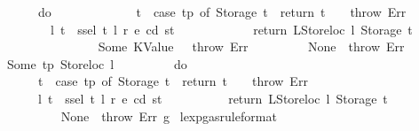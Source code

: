 \begin{isabellebody}
\ \ \ \ \ \ \ \ \ \ do\ {\isacharbraceleft}{\kern0pt}\isanewline
\ \ \ \ \ \ \ \ \ \ \ \ t\ {\isasymleftarrow}\ {\isacharparenleft}{\kern0pt}case\ tp\ of\ Storage\ t\ {\isasymRightarrow}\ return\ t\ {\isacharbar}{\kern0pt}\ {\isacharunderscore}{\kern0pt}\ {\isasymRightarrow}\ throw\ Err{\isacharparenright}{\kern0pt}{\isacharsemicolon}{\kern0pt}\isanewline
\ \ \ \ \ \ \ \ \ \ \ \ {\isacharparenleft}{\kern0pt}l{\isacharprime}{\kern0pt}{\isacharprime}{\kern0pt}{\isacharcomma}{\kern0pt}\ t{\isacharprime}{\kern0pt}{\isacharparenright}{\kern0pt}\ {\isasymleftarrow}\ ssel\ t\ l{\isacharprime}{\kern0pt}\ r\ e\ cd\ st{\isacharsemicolon}{\kern0pt}\isanewline
\ \ \ \ \ \ \ \ \ \ \ \ return\ {\isacharparenleft}{\kern0pt}LStoreloc\ l{\isacharprime}{\kern0pt}{\isacharprime}{\kern0pt}{\isacharcomma}{\kern0pt}\ Storage\ t{\isacharprime}{\kern0pt}{\isacharparenright}{\kern0pt}\isanewline
\ \ \ \ \ \ \ \ \ \ {\isacharbraceright}{\kern0pt}\isanewline
\ \ \ \ \ \ \ \ {\isacharbar}{\kern0pt}\ Some\ {\isacharparenleft}{\kern0pt}KValue\ {\isacharunderscore}{\kern0pt}{\isacharparenright}{\kern0pt}\ {\isasymRightarrow}\ throw\ Err\isanewline
\ \ \ \ \ \ \ \ {\isacharbar}{\kern0pt}\ None\ {\isasymRightarrow}\ throw\ Err{\isacharparenright}{\kern0pt}\isanewline
\ \ \ \ {\isacharbar}{\kern0pt}\ Some\ {\isacharparenleft}{\kern0pt}tp{\isacharcomma}{\kern0pt}\ Storeloc\ l{\isacharparenright}{\kern0pt}\ {\isasymRightarrow}\isanewline
\ \ \ \ \ \ \ \ do\ {\isacharbraceleft}{\kern0pt}\isanewline
\ \ \ \ \ \ \ \ \ \ t\ {\isasymleftarrow}\ {\isacharparenleft}{\kern0pt}case\ tp\ of\ Storage\ t\ {\isasymRightarrow}\ return\ t\ {\isacharbar}{\kern0pt}\ {\isacharunderscore}{\kern0pt}\ {\isasymRightarrow}\ throw\ Err{\isacharparenright}{\kern0pt}{\isacharsemicolon}{\kern0pt}\isanewline
\ \ \ \ \ \ \ \ \ \ {\isacharparenleft}{\kern0pt}l{\isacharprime}{\kern0pt}{\isacharcomma}{\kern0pt}\ t{\isacharprime}{\kern0pt}{\isacharparenright}{\kern0pt}\ {\isasymleftarrow}\ ssel\ t\ l\ r\ e\ cd\ st{\isacharsemicolon}{\kern0pt}\isanewline
\ \ \ \ \ \ \ \ \ \ return\ {\isacharparenleft}{\kern0pt}LStoreloc\ l{\isacharprime}{\kern0pt}{\isacharcomma}{\kern0pt}\ Storage\ t{\isacharprime}{\kern0pt}{\isacharparenright}{\kern0pt}\isanewline
\ \ \ \ \ \ \ \ {\isacharbraceright}{\kern0pt}\isanewline
\ \ \ \ {\isacharbar}{\kern0pt}\ None\ {\isasymRightarrow}\ throw\ Err{\isacharparenright}{\kern0pt}\ g{\isachardoublequoteclose}\isanewline
\isanewline
{}\isamarkupfalse%
\ lexp{\isacharunderscore}{\kern0pt}gas{\isacharbrackleft}{\kern0pt}rule{\isacharunderscore}{\kern0pt}format{\isacharbrackright}{\kern0pt}{\isacharcolon}{\kern0pt}\isanewline

\end{isabellebody}
